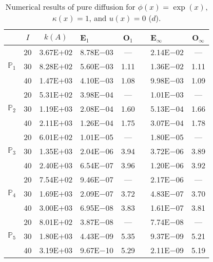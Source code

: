 \begin{table}[H]
\centering
\caption{Numerical results of pure diffusion for $\phi(x)=\exp(x)$, $\kappa(x)=1$, and $u(x)=0$ ($d$).}
\begin{tabular}{@{}l c c l c c l c@{}}
\toprule
 & $I$ & $k(A)$ & E$_1$ & O$_1$ && E$_{\infty}$ & O$_{\infty}$\\
\midrule
\multirow{3}{*}{$\mathbb{P}_{1}$}
 & 20 & 3.67E$+$02 & 8.78E$-$03 & --- && 2.14E$-$02 & ---\\
 & 30 & 8.28E$+$02 & 5.60E$-$03 & 1.11 && 1.36E$-$02 & 1.11\\
 & 40 & 1.47E$+$03 & 4.10E$-$03 & 1.08 && 9.98E$-$03 & 1.09\\
\midrule
\multirow{3}{*}{$\mathbb{P}_{2}$}
 & 20 & 5.31E$+$02 & 3.98E$-$04 & --- && 1.01E$-$03 & ---\\
 & 30 & 1.19E$+$03 & 2.08E$-$04 & 1.60 && 5.13E$-$04 & 1.66\\
 & 40 & 2.11E$+$03 & 1.26E$-$04 & 1.75 && 3.07E$-$04 & 1.78\\
\midrule
\multirow{3}{*}{$\mathbb{P}_{3}$}
 & 20 & 6.01E$+$02 & 1.01E$-$05 & --- && 1.80E$-$05 & ---\\
 & 30 & 1.35E$+$03 & 2.04E$-$06 & 3.94 && 3.72E$-$06 & 3.89\\
 & 40 & 2.40E$+$03 & 6.54E$-$07 & 3.96 && 1.20E$-$06 & 3.92\\
\midrule
\multirow{3}{*}{$\mathbb{P}_{4}$}
 & 20 & 7.54E$+$02 & 9.46E$-$07 & --- && 2.17E$-$06 & ---\\
 & 30 & 1.69E$+$03 & 2.09E$-$07 & 3.72 && 4.83E$-$07 & 3.70\\
 & 40 & 3.00E$+$03 & 6.95E$-$08 & 3.83 && 1.61E$-$07 & 3.81\\
\midrule
\multirow{3}{*}{$\mathbb{P}_{5}$}
 & 20 & 8.01E$+$02 & 3.87E$-$08 & --- && 7.74E$-$08 & ---\\
 & 30 & 1.80E$+$03 & 4.43E$-$09 & 5.35 && 9.37E$-$09 & 5.21\\
 & 40 & 3.19E$+$03 & 9.67E$-$10 & 5.29 && 2.11E$-$09 & 5.19\\
\bottomrule
\end{tabular}
\end{table}